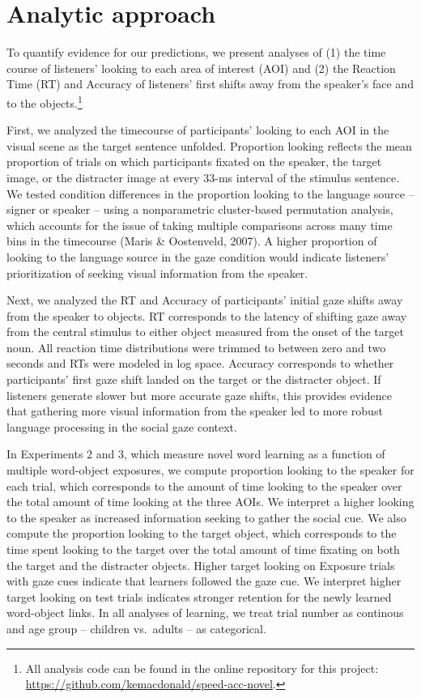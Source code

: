 \documentclass[man,floatsintext]{apa6}
\let\rmarkdownfootnote\footnote%
\def\footnote{\protect\rmarkdownfootnote}
\begin{document}
\section{Analytic approach}\label{analytic-approach}

To quantify evidence for our predictions, we present analyses of (1) the
time course of listeners' looking to each area of interest (AOI) and (2)
the Reaction Time (RT) and Accuracy of listeners' first shifts away from
the speaker's face and to the objects.\footnote{All analysis code can be
  found in the online repository for this project:
  \url{https://github.com/kemacdonald/speed-acc-novel}.}

First, we analyzed the timecourse of participants' looking to each AOI
in the visual scene as the target sentence unfolded. Proportion looking
reflects the mean proportion of trials on which participants fixated on
the speaker, the target image, or the distracter image at every 33-ms
interval of the stimulus sentence. We tested condition differences in
the proportion looking to the language source -- signer or speaker --
using a nonparametric cluster-based permutation analysis, which accounts
for the issue of taking multiple comparisons across many time bins in
the timecourse (Maris \& Oostenveld, 2007). A higher proportion of
looking to the language source in the gaze condition would indicate
listeners' prioritization of seeking visual information from the
speaker.

Next, we analyzed the RT and Accuracy of participants' initial gaze
shifts away from the speaker to objects. RT corresponds to the latency
of shifting gaze away from the central stimulus to either object
measured from the onset of the target noun. All reaction time
distributions were trimmed to between zero and two seconds and RTs were
modeled in log space. Accuracy corresponds to whether participants'
first gaze shift landed on the target or the distracter object. If
listeners generate slower but more accurate gaze shifts, this provides
evidence that gathering more visual information from the speaker led to
more robust language processing in the social gaze context.

In Experiments 2 and 3, which measure novel word learning as a function
of multiple word-object exposures, we compute proportion looking to the
speaker for each trial, which corresponds to the amount of time looking
to the speaker over the total amount of time looking at the three AOIs.
We interpret a higher looking to the speaker as increased information
seeking to gather the social cue. We also compute the proportion looking
to the target object, which corresponds to the time spent looking to the
target over the total amount of time fixating on both the target and the
distracter objects. Higher target looking on Exposure trials with gaze
cues indicate that learners followed the gaze cue. We interpret higher
target looking on test trials indicates stronger retention for the newly
learned word-object links. In all analyses of learning, we treat trial
number as continous and age group -- children vs.~adults -- as
categorical.
\end{document}
